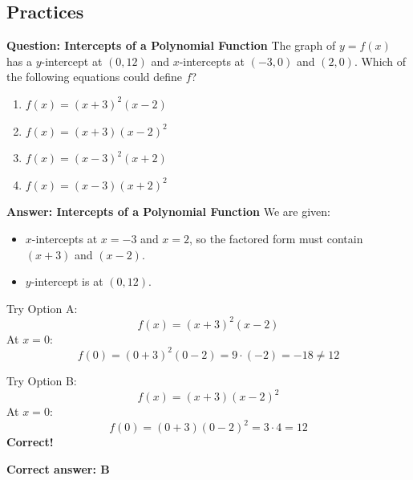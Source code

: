 \documentclass{beamer}
\begin{document}
\begin{frame}
\section{Practices}
\end{frame}


\begin{frame}{\textbf{Question: Intercepts of a Polynomial Function}}
The graph of $y = f(x)$ has a $y$-intercept at $(0, 12)$ and $x$-intercepts at $(-3, 0)$ and $(2, 0)$.  
Which of the following equations could define $f$?
\vspace{1em}

\begin{enumerate}
\item[A] $f(x) = (x + 3)^2(x - 2)$
\item[B] $f(x) = (x + 3)(x - 2)^2$
\item[C] $f(x) = (x - 3)^2(x + 2)$
\item[D] $f(x) = (x - 3)(x + 2)^2$
\end{enumerate}
\end{frame}

\begin{frame}{\textbf{Answer: Intercepts of a Polynomial Function}}
We are given:
\begin{itemize}
  \item $x$-intercepts at $x = -3$ and $x = 2$, so the factored form must contain $(x + 3)$ and $(x - 2)$.
  \item $y$-intercept is at $(0, 12)$.
\end{itemize}

Try Option A:
\[
f(x) = (x + 3)^2(x - 2)
\]
At $x = 0$:
\[
f(0) = (0 + 3)^2(0 - 2) = 9 \cdot (-2) = -18 \ne 12
\]

Try Option B:
\[
f(x) = (x + 3)(x - 2)^2
\]
At $x = 0$:
\[
f(0) = (0 + 3)(0 - 2)^2 = 3 \cdot 4 = 12
\]
\textbf{Correct!}

\bigskip
\textbf{Correct answer: B}
\end{frame}
\end{document}
